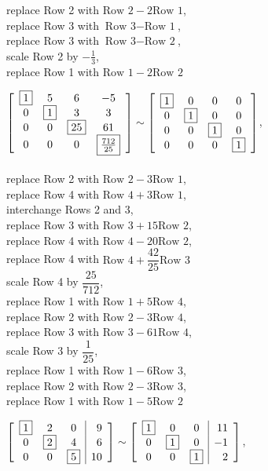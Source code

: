 \begin{enumerate}[!HW!, start=1]
\begin{multicols}{2}
replace Row 2 with $\text{Row 2} - 2\text{Row 1}$,\\ replace Row 3 with $\text{Row 3} - \text{Row 1}$,\\ replace Row 3 with $\text{Row 3} - \text{Row 2}$,\\ scale Row 2 by $-\frac{1}{3}$,\\ replace Row 1 with $\text{Row 1} - 2\text{Row 2}$ %
\end{multicols}
\begin{multicols}{2}
\itemspade $\mtx{cccc}{\fbox{1}&5&6&-5\\0&\fbox{1}&3&3\\ 0&0&\fbox{25}&61\\0&0&0&\fbox{$\frac{712}{25}$}} \sim \mtx{cccc}{\fbox{1}&0&0&0\\0&\fbox{1}&0&0\\0&0&\fbox{1}&0\\0&0&0&\fbox{1}}$,\\\\ replace Row 2 with $\text{Row 2} - 3\text{Row 1}$,\\ replace Row 4 with $\text{Row 4} + 3\text{Row 1}$,\\ interchange Rows 2 and 3,\\ replace Row 3 with $\text{Row 3} + 15\text{Row 2}$,\\ replace Row 4 with $\text{Row 4} - 20\text{Row 2}$,\\ replace Row 4 with $\text{Row 4} + \dfrac{42}{25}\text{Row 3}$\\ scale Row 4 by $\dfrac{25}{712}$,\\ replace Row 1 with $\text{Row 1} + 5\text{Row 4}$,\\ replace Row 2 with $\text{Row 2} - 3\text{Row 4}$,\\ replace Row 3 with $\text{Row 3} - 61\text{Row 4}$,\\ scale Row 3 by $\dfrac{1}{25}$,\\ replace Row 1 with $\text{Row 1} - 6\text{Row 3}$,\\ replace Row 2 with $\text{Row 2} - 3\text{Row 3}$,\\ replace Row 1 with $\text{Row 1} - 5\text{Row 2}$
\end{multicols}

\begin{multicols}{2} %
\item $\mtx{ccc|r}{\fbox{1}&2&0&9\\0&\fbox{2}&4&6\\0&0&\fbox{5}&10}\sim \mtx{ccc|r}{\fbox{1}&0&0&11\\0&\fbox{1}&0&-1\\0&0&\fbox{1}&2}$,\columnbreak


\end{multicols}
\end{enumerate}
